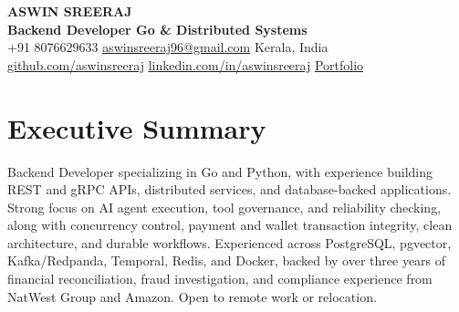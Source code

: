 \documentclass[10pt,a4paper]{article}
\begin{document}
\color{textdark}

\begin{center}
  {\fontsize{19}{22}\selectfont\bfseries ASWIN SREERAJ}\\[3pt]
  {\fontsize{10.5}{13}\selectfont\textbf{Backend Developer \enspace\textbullet\enspace Go \& Distributed Systems}}\\[3pt]
  {\small
    \faPhone*\enspace +91 8076629633
    \enspace\textbar\enspace
    \faEnvelope\enspace \href{mailto:aswinsreeraj96@gmail.com}{\color{linkblue}aswinsreeraj96@gmail.com}
    \enspace\textbar\enspace
    \faMapMarker*\enspace Kerala, India
  }\\[2pt]
  {\small
    \faGithub\enspace \href{https://github.com/aswinsreeraj}{\color{linkblue}github.com/aswinsreeraj}
    \enspace\textbar\enspace
    \faLinkedin\enspace \href{https://linkedin.com/in/aswinsreeraj}{\color{linkblue}linkedin.com/in/aswinsreeraj}
    \enspace\textbar\enspace
    \faGlobe\enspace \href{https://aswinsreeraj.online/}{\color{linkblue}Portfolio}
  }
\end{center}
\vspace{-2pt}

\section*{Executive Summary}
Backend Developer specializing in Go and Python, with experience building REST and gRPC APIs, distributed services, and database-backed applications. Strong focus on AI agent execution, tool governance, and reliability checking, along with concurrency control, payment and wallet transaction integrity, clean architecture, and durable workflows. Experienced across PostgreSQL, pgvector, Kafka/Redpanda, Temporal, Redis, and Docker, backed by over three years of financial reconciliation, fraud investigation, and compliance experience from NatWest Group and Amazon. Open to remote work or relocation.

\end{document}
